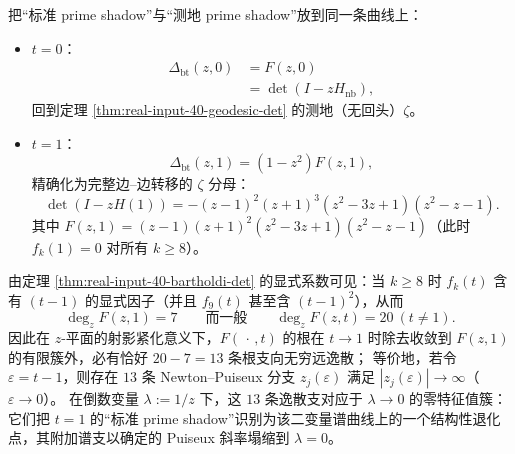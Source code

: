 \begin{remark}[两个关键特化]\label{rem:real-input-40-bartholdi-specializations}
把“标准 prime shadow”与“测地 prime shadow”放到同一条曲线上：
\begin{itemize}
  \item \textbf{\(t=0\)}：
  \[
  \begin{aligned}
  \Delta_{\mathrm{bt}}(z,0)&=F(z,0)\\
  &=\det(I-zH_{\mathrm{nb}}),
  \end{aligned}
  \]
  回到定理 \ref{thm:real-input-40-geodesic-det} 的测地（无回头）\(\zeta\)。
  \item \textbf{\(t=1\)}：
  \[
  \Delta_{\mathrm{bt}}(z,1)=(1-z^2)F(z,1),
  \]
  精确化为完整边--边转移的 \(\zeta\) 分母：
  \[
  \det(I-zH(1))
  =-(z-1)^2(z+1)^3(z^2-3z+1)(z^2-z-1).
  \]
  其中 \(F(z,1)=(z-1)(z+1)^2(z^2-3z+1)(z^2-z-1)\)（此时 \(f_k(1)=0\) 对所有 \(k\ge 8\)）。
\end{itemize}
\end{remark}

\begin{remark}\label{rem:real-input-40-bartholdi-infinite-root-cluster}
由定理 \ref{thm:real-input-40-bartholdi-det} 的显式系数可见：当 \(k\ge 8\) 时 \(f_k(t)\) 含有 \((t-1)\) 的显式因子（并且 \(f_9(t)\) 甚至含 \((t-1)^2\)），从而
\[
\deg_z F(z,1)=7
\qquad\text{而一般}\qquad
\deg_z F(z,t)=20\ (t\neq 1).
\]
因此在 \(z\)-平面的射影紧化意义下，\(F(\,\cdot\,,t)\) 的根在 \(t\to 1\) 时除去收敛到 \(F(z,1)\) 的有限簇外，必有恰好 \(20-7=13\) 条根支向无穷远逸散；
等价地，若令 \(\varepsilon=t-1\)，则存在 \(13\) 条 Newton--Puiseux 分支 \(z_j(\varepsilon)\) 满足 \(|z_j(\varepsilon)|\to\infty\)（\(\varepsilon\to 0\)）。
在倒数变量 \(\lambda:=1/z\) 下，这 \(13\) 条逸散支对应于 \(\lambda\to 0\) 的零特征值簇：它们把 \(t=1\) 的“标准 prime shadow”识别为该二变量谱曲线上的一个结构性退化点，其附加谱支以确定的 Puiseux 斜率塌缩到 \(\lambda=0\)。
\end{remark}

